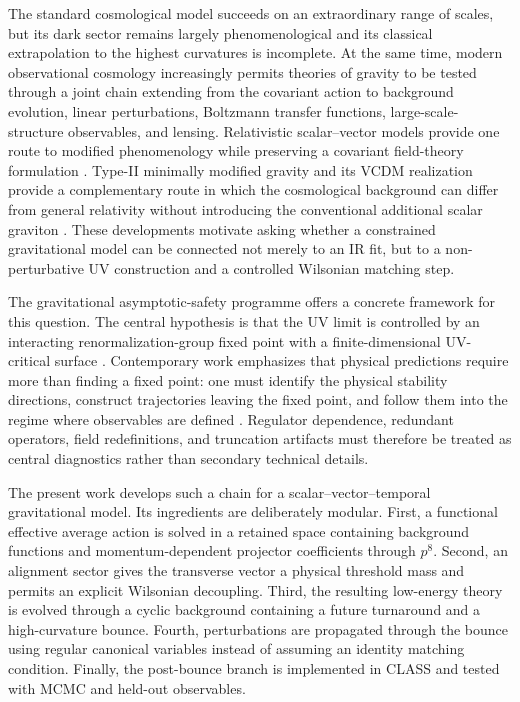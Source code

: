 \documentclass[12pt]{iopart}
\begin{document}
The standard cosmological model succeeds on an extraordinary range of scales, but its dark sector remains largely phenomenological and its classical extrapolation to the highest curvatures is incomplete.  At the same time, modern observational cosmology increasingly permits theories of gravity to be tested through a joint chain extending from the covariant action to background evolution, linear perturbations, Boltzmann transfer functions, large-scale-structure observables, and lensing.  Relativistic scalar--vector models provide one route to modified phenomenology while preserving a covariant field-theory formulation \cite{SkordisZlosnik2021,SkordisZlosnik2022,BatakiSkordisZlosnik2024,RosaZlosnik2024}.  Type-II minimally modified gravity and its VCDM realization provide a complementary route in which the cosmological background can differ from general relativity without introducing the conventional additional scalar graviton \cite{DeFeliceMukohyamaPookkillath2021,DeFeliceMaedaMukohyamaPookkillath2022,GanzMartensMukohyamaNamba2023}.  These developments motivate asking whether a constrained gravitational model can be connected not merely to an IR fit, but to a non-perturbative UV construction and a controlled Wilsonian matching step.

The gravitational asymptotic-safety programme offers a concrete framework for this question.  The central hypothesis is that the UV limit is controlled by an interacting renormalization-group fixed point with a finite-dimensional UV-critical surface \cite{Weinberg1979,Reuter1998,Saueressig2023}.  Contemporary work emphasizes that physical predictions require more than finding a fixed point: one must identify the physical stability directions, construct trajectories leaving the fixed point, and follow them into the regime where observables are defined \cite{Knorr2023,DAngelo2024,BeckerKurovSaueressig2024,SaueressigSilva2024,Thiemann2024}.  Regulator dependence, redundant operators, field redefinitions, and truncation artifacts must therefore be treated as central diagnostics rather than secondary technical details.

The present work develops such a chain for a scalar--vector--temporal gravitational model.  Its ingredients are deliberately modular.  First, a functional effective average action is solved in a retained space containing background functions and momentum-dependent projector coefficients through $p^8$.  Second, an alignment sector gives the transverse vector a physical threshold mass and permits an explicit Wilsonian decoupling.  Third, the resulting low-energy theory is evolved through a cyclic background containing a future turnaround and a high-curvature bounce.  Fourth, perturbations are propagated through the bounce using regular canonical variables instead of assuming an identity matching condition.  Finally, the post-bounce branch is implemented in CLASS and tested with MCMC and held-out observables.
\end{document}
